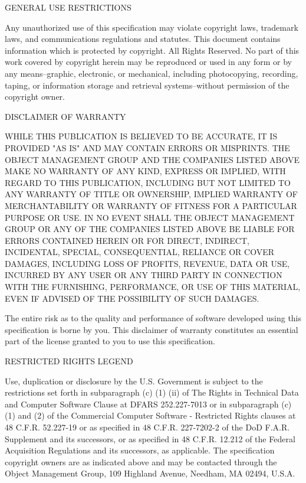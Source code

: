 \documentclass[10pt, a4paper]{isov2}
\newcommand{\OMGparagraph}[1]{
\vspace{23pt}
{\centerline {#1}}
\vspace{3pt}
}
\begin{document}
\OMGparagraph{GENERAL USE RESTRICTIONS}
Any unauthorized use of this specification may violate copyright laws, trademark laws, and 
 communications regulations and statutes. This document contains information which is protected by 
  copyright. All Rights Reserved. No part of this work covered by copyright herein may be 
   reproduced or used in any form or by any means--graphic, electronic, or mechanical, including 
    photocopying, recording, taping, or information storage and retrieval systems--without 
	 permission of the copyright owner.

\newpage
\OMGparagraph{DISCLAIMER OF WARRANTY}
WHILE THIS PUBLICATION IS BELIEVED TO BE ACCURATE, IT IS PROVIDED "AS IS" AND MAY CONTAIN ERRORS OR MISPRINTS. THE OBJECT MANAGEMENT GROUP AND THE COMPANIES LISTED ABOVE MAKE NO WARRANTY OF ANY KIND, EXPRESS OR IMPLIED, WITH REGARD TO THIS PUBLICATION, INCLUDING BUT NOT LIMITED TO ANY WARRANTY OF TITLE OR OWNERSHIP, IMPLIED WARRANTY OF MERCHANTABILITY OR WARRANTY OF FITNESS FOR A PARTICULAR PURPOSE OR USE. IN NO EVENT SHALL THE OBJECT MANAGEMENT GROUP OR ANY OF THE COMPANIES LISTED ABOVE BE LIABLE FOR ERRORS CONTAINED HEREIN OR FOR DIRECT, INDIRECT, INCIDENTAL, SPECIAL, CONSEQUENTIAL, RELIANCE OR COVER DAMAGES, INCLUDING LOSS OF PROFITS, REVENUE, DATA OR USE, INCURRED BY ANY USER OR ANY THIRD PARTY IN CONNECTION WITH THE FURNISHING, PERFORMANCE, OR USE OF THIS MATERIAL, EVEN IF ADVISED OF THE POSSIBILITY OF SUCH DAMAGES.


The entire risk as to the quality and performance of software developed using this specification is borne by you. This disclaimer of warranty constitutes an essential part of the license granted to you to use this specification.


\OMGparagraph{RESTRICTED RIGHTS LEGEND}
Use, duplication or disclosure by the U.S. Government is subject to the restrictions set forth in 
 subparagraph (c) (1) (ii) of The Rights in Technical Data and Computer Software Clause at DFARS 
  252.227-7013 or in subparagraph (c)(1) and (2) of the Commercial Computer Software - Restricted 
   Rights clauses at 48 C.F.R. 52.227-19 or as specified in 48 C.F.R. 227-7202-2 of the DoD F.A.R. 
    Supplement and its successors, or as specified in 48 C.F.R. 12.212 of the Federal Acquisition 
 Regulations and its successors, as applicable. The specification copyright owners are as 
 indicated above and may be contacted through the Object Management Group, 109 Highland 
 Avenue, Needham, MA 02494, U.S.A.
\end{document}
